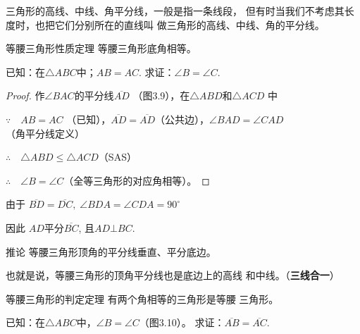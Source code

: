 三角形的高线、中线、角平分线，一般是指一条线段，
但有时当我们不考虑其长度时，也把它们分别所在的直线叫
做三角形的高线、中线、角的平分线。


\begin{blk}
    {等腰三角形性质定理} 等腰三角形底角相等。
\end{blk}

已知：在$\triangle ABC$中；$AB=AC$.
求证：$\angle B=\angle C$.

\begin{figure}[htp]
    \centering
{}
    \caption{}
\end{figure}
\begin{proof}
    作$\angle BAC$的平分线$\overline{AD}$
（图3.9），在$\triangle ABD$和$\triangle ACD$
中

$\because\quad AB=AC$ （已知），$\overline{AD}=\overline{AD}$（公共边），$\angle BAD=\angle CAD$（角平分线定义）

$\therefore\quad \triangle ABD≤\triangle ACD$（SAS）

$\therefore\quad \angle B=\angle C$（全等三角形的对应角相等）。
\end{proof}


由于 $\overline{BD}=\overline{DC},\; \angle BDA=\angle CDA=90^{\circ}$

因此 $AD$平分$\overline{BC}$, 且$AD\bot BC$.

\begin{blk}{推论 }
    等腰三角形顶角的平分线垂直、平分底边。
\end{blk}

也就是说，等腰三角形的顶角平分线也是底边上的高线
和中线。（\textbf{三线合一}）

\begin{blk}
    {等腰三角形的判定定理} 有两个角相等的三角形是等腰
三角形。
\end{blk}

已知：在$\triangle ABC$中，$\angle B=\angle C$（图3.10）。
求证：$\overline{AB}=\overline{AC}$.

\begin{figure}[htp]
    \centering
{}
    \caption{}
\end{figure}


